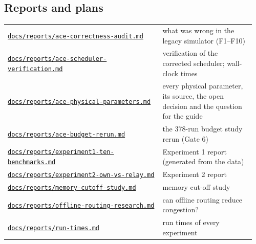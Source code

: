 {\small
\subsection*{Reports and plans}
\begin{longtable}{@{}p{0.60\linewidth}p{0.36\linewidth}@{}}
\href{https://github.com/sanjeevkrishnaa/Compiler-Driven-ACE/blob/codex/ace-scheduler-correctness/docs/reports/ace-correctness-audit.md}{\nolinkurl{docs/reports/ace-correctness-audit.md}} & what was wrong in the legacy simulator (F1–F10) \\
\href{https://github.com/sanjeevkrishnaa/Compiler-Driven-ACE/blob/codex/ace-scheduler-correctness/docs/reports/ace-scheduler-verification.md}{\nolinkurl{docs/reports/ace-scheduler-verification.md}} & verification of the corrected scheduler; wall-clock times \\
\href{https://github.com/sanjeevkrishnaa/Compiler-Driven-ACE/blob/codex/ace-scheduler-correctness/docs/reports/ace-physical-parameters.md}{\nolinkurl{docs/reports/ace-physical-parameters.md}} & every physical parameter, its source, the open decision and the question for the guide \\
\href{https://github.com/sanjeevkrishnaa/Compiler-Driven-ACE/blob/codex/ace-scheduler-correctness/docs/reports/ace-budget-rerun.md}{\nolinkurl{docs/reports/ace-budget-rerun.md}} & the 378-run budget study rerun (Gate 6) \\
\href{https://github.com/sanjeevkrishnaa/Compiler-Driven-ACE/blob/codex/ace-scheduler-correctness/docs/reports/experiment1-ten-benchmarks.md}{\nolinkurl{docs/reports/experiment1-ten-benchmarks.md}} & Experiment 1 report (generated from the data) \\
\href{https://github.com/sanjeevkrishnaa/Compiler-Driven-ACE/blob/codex/ace-scheduler-correctness/docs/reports/experiment2-own-vs-relay.md}{\nolinkurl{docs/reports/experiment2-own-vs-relay.md}} & Experiment 2 report \\
\href{https://github.com/sanjeevkrishnaa/Compiler-Driven-ACE/blob/codex/ace-scheduler-correctness/docs/reports/memory-cutoff-study.md}{\nolinkurl{docs/reports/memory-cutoff-study.md}} & memory cut-off study \\
\href{https://github.com/sanjeevkrishnaa/Compiler-Driven-ACE/blob/codex/ace-scheduler-correctness/docs/reports/offline-routing-research.md}{\nolinkurl{docs/reports/offline-routing-research.md}} & can offline routing reduce congestion? \\
\href{https://github.com/sanjeevkrishnaa/Compiler-Driven-ACE/blob/codex/ace-scheduler-correctness/docs/reports/run-times.md}{\nolinkurl{docs/reports/run-times.md}} & run times of every experiment \\

\end{longtable}}
